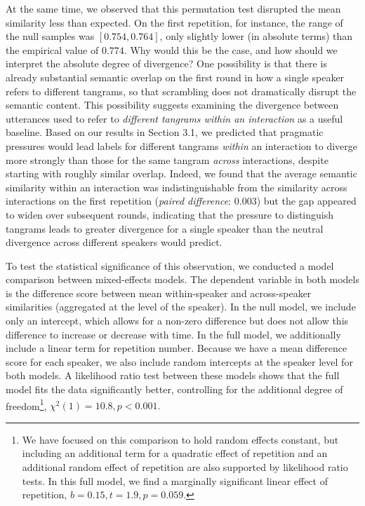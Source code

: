 \documentclass[alpha-refs]{wiley-article}
\begin{document}
At the same time, we observed that this permutation test disrupted the mean similarity less than expected.
On the first repetition, for instance, the range of the null samples was $[0.754, 0.764]$, only slightly lower (in absolute terms) than the empirical value of $0.774$. 
Why would this be the case, and how should we interpret the absolute degree of divergence?
One possibility is that there is already substantial semantic overlap on the first round in how a single speaker refers to different tangrams, so that scrambling does not dramatically disrupt the semantic content.
This possibility suggests examining the divergence between utterances used to refer to \emph{different tangrams within an interaction} as a useful baseline. 
Based on our results in Section 3.1, we predicted that pragmatic pressures would lead labels for different tangrams \emph{within} an interaction to diverge more strongly than those for the same tangram \emph{across} interactions, despite starting with roughly similar overlap.
Indeed, we found that the average semantic similarity within an interaction was indistinguishable from the similarity across interactions on the first repetition (\emph{paired difference}: $0.003$) but the gap appeared to widen over subsequent rounds, indicating that the pressure to distinguish tangrams leads to greater divergence for a single speaker than the neutral divergence across different speakers would predict.

To test the statistical significance of this observation, we conducted a model comparison between mixed-effects models. 
The dependent variable in both models is the difference score between mean within-speaker and across-speaker similarities (aggregated at the level of the speaker). 
In the null model, we include only an intercept, which allows for a non-zero difference but does not allow this difference to increase or decrease with time.
In the full model, we additionally include a linear term for repetition number.
Because we have a mean difference score for each speaker, we also include random intercepts at the speaker level for both models.
A likelihood ratio test between these models shows that the full model fits the data significantly better, controlling for the additional degree of freedom\footnote{We have focused on this comparison to hold random effects constant, but including an additional term for a quadratic effect of repetition and an additional random effect of repetition are also supported by likelihood ratio tests. In this full model, we find a marginally significant linear effect of repetition, $b = 0.15, t = 1.9, p = 0.059$.}, $\chi^2(1) = 10.8, p < 0.001.$
\end{document}
